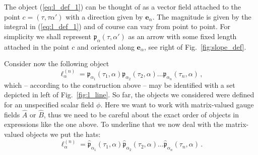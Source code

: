 \documentclass[english,american]{article}
\begin{document}
The object (\ref{eq:l_def_1}) can be thought of as a vector field
attached to the point $c=\left(\tau,\tau\alpha'\right)$ with a direction
given by $\mathbf{e}_{\alpha}$. The magnitude is given by the integral
in (\ref{eq:l_def_1}) and of course can vary from point to point. For simplicity we shall represent \foreignlanguage{english}{$\mathfrak{p}_{\alpha}\left(\tau,\alpha'\right)$}
as an arrow with some fixed length attached in the point $c$ and
oriented along $\mathbf{e}_{\alpha}$, see right of Fig.~\ref{fig:slope_def}.

Consider now the following object 
\begin{equation}
\ell_{\alpha}^{\left(n\right)}=\mathfrak{p}_{\alpha_{1}}\left(\tau_{1},\alpha\right)\mathfrak{p}_{\alpha_{2}}\left(\tau_{2},\alpha\right)\dots\mathfrak{p}_{\alpha_{n}}\left(\tau_{n},\alpha\right)\,,
\end{equation}
which -- according to the construction above -- may be identified
with a set depicted in left of Fig.~\ref{fig:l_line}. So far, the
objects we considered were defined for an unspecified scalar field
$\phi$. Here we want to work with matrix-valued gauge fields $\hat{A}$
or $\hat{B}$, thus we need to be careful about the exact order of objects
in expressions like the one above. To underline that we now deal with
the matrix-valued objects we put the hats:
\begin{equation}
\ell_{\alpha}^{\left(n\right)}=\hat{\mathfrak{p}}_{\alpha_{1}}\left(\tau_{1},\alpha\right)\hat{\mathfrak{p}}_{\alpha_{2}}\left(\tau_{2},\alpha\right)\dots\hat{\mathfrak{p}}_{\alpha_{n}}\left(\tau_{n},\alpha\right)\,.
\end{equation}
\end{document}
